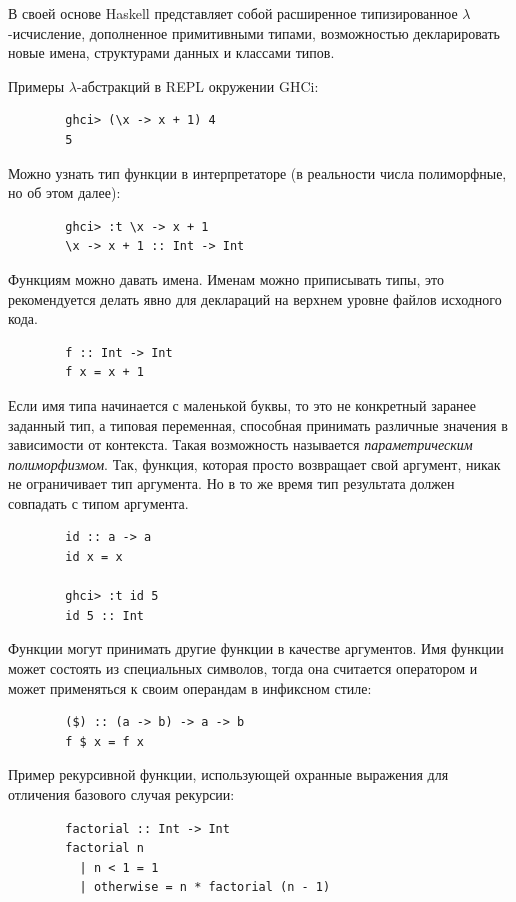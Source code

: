 \documentclass[12pt]{article}
\newcommand{\point}[1]{{\color{blue}\textit{#1}}} %
\begin{document}
    В своей основе Haskell представляет собой расширенное типизированное $\lambda$-исчисление, дополненное примитивными типами, возможностью декларировать новые имена, структурами данных и классами типов.

    Примеры $\lambda$-абстракций в REPL окружении GHCi:

    \begin{verbatim}
        ghci> (\x -> x + 1) 4
        5
    \end{verbatim}

    Можно узнать тип функции в интерпретаторе (в реальности числа полиморфные, но об этом далее):
    \begin{verbatim}
        ghci> :t \x -> x + 1
        \x -> x + 1 :: Int -> Int
    \end{verbatim}

    Функциям можно давать имена.
    Именам можно приписывать типы, это рекомендуется делать явно для деклараций на верхнем уровне файлов исходного кода.
    \begin{verbatim}
        f :: Int -> Int
        f x = x + 1
    \end{verbatim}

    Если имя типа начинается с маленькой буквы, то это не конкретный заранее заданный тип, а типовая переменная, способная принимать различные значения в зависимости от контекста.
    Такая возможность называется \point{параметрическим полиморфизмом}.
    Так, функция, которая просто возвращает свой аргумент, никак не ограничивает тип аргумента.
    Но в то же время тип результата должен совпадать с типом аргумента.
    \begin{verbatim}
        id :: a -> a
        id x = x

        ghci> :t id 5
        id 5 :: Int
    \end{verbatim}

    Функции могут принимать другие функции в качестве аргументов.
    Имя функции может состоять из специальных символов, тогда она считается оператором и может применяться к своим операндам в инфиксном стиле:
    \begin{verbatim}
        ($) :: (a -> b) -> a -> b
        f $ x = f x
    \end{verbatim}

    Пример рекурсивной функции, использующей охранные выражения для отличения базового случая рекурсии:
    \begin{verbatim}
        factorial :: Int -> Int
        factorial n
          | n < 1 = 1
          | otherwise = n * factorial (n - 1)
    \end{verbatim}
\end{document}
